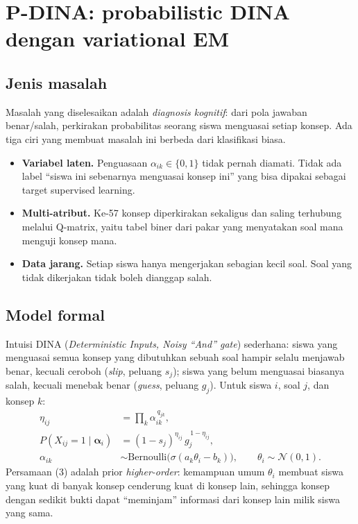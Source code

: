 \documentclass[11pt,a4paper]{article}
\begin{document}
\section{P-DINA: probabilistic DINA dengan variational EM}

\subsection{Jenis masalah}

Masalah yang diselesaikan adalah \emph{diagnosis kognitif}: dari pola jawaban benar/salah, perkirakan probabilitas
seorang siswa menguasai setiap konsep. Ada tiga ciri yang membuat masalah ini berbeda dari klasifikasi biasa.

\begin{itemize}
  \item \textbf{Variabel laten.} Penguasaan $\alpha_{ik}\in\{0,1\}$ tidak pernah diamati. Tidak ada label ``siswa ini
        sebenarnya menguasai konsep ini'' yang bisa dipakai sebagai target supervised learning.
  \item \textbf{Multi-atribut.} Ke-57 konsep diperkirakan sekaligus dan saling terhubung melalui Q-matrix, yaitu tabel
        biner dari pakar yang menyatakan soal mana menguji konsep mana.
  \item \textbf{Data jarang.} Setiap siswa hanya mengerjakan sebagian kecil soal. Soal yang tidak dikerjakan tidak
        boleh dianggap salah.
\end{itemize}

\subsection{Model formal}

Intuisi DINA (\emph{Deterministic Inputs, Noisy ``And'' gate}) sederhana: siswa yang menguasai semua konsep yang
dibutuhkan sebuah soal hampir selalu menjawab benar, kecuali ceroboh (\emph{slip}, peluang $s_j$); siswa yang belum
menguasai biasanya salah, kecuali menebak benar (\emph{guess}, peluang $g_j$). Untuk siswa $i$, soal $j$, dan konsep
$k$:
\begin{align}
  \eta_{ij} &= \prod_k \alpha_{ik}^{\,q_{jk}}, \\
  P(X_{ij}=1\mid\boldsymbol\alpha_i) &= (1-s_j)^{\eta_{ij}}\, g_j^{\,1-\eta_{ij}}, \\
  \alpha_{ik} &\sim \mathrm{Bernoulli}\big(\sigma(a_k\theta_i-b_k)\big),\qquad \theta_i\sim\mathcal N(0,1).
\end{align}
Persamaan (3) adalah prior \emph{higher-order}: kemampuan umum $\theta_i$ membuat siswa yang kuat di banyak konsep
cenderung kuat di konsep lain, sehingga konsep dengan sedikit bukti dapat ``meminjam'' informasi dari konsep lain
milik siswa yang sama.
\end{document}
